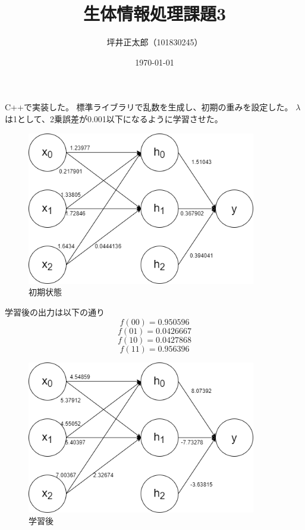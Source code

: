 \documentclass[a4paper,10pt]{jsarticle}
\begin{document}
\title{生体情報処理課題3}
\author{坪井正太郎（101830245）}
\date{\today}
\maketitle
\section{}
C++で実装した。
標準ライブラリで乱数を生成し、初期の重みを設定した。
$\lambda$は1として、2乗誤差が0.001以下になるように学習させた。

\begin{figure}[H]
  \centering
  \includegraphics[width=10cm]{01.png}
  \caption{初期状態}
\end{figure}

学習後の出力は以下の通り
\[f(00)=0.950596\]
\[f(01)=0.0426667\]
\[f(10)=0.0427868\]
\[f(11)=0.956396\]

\begin{figure}[H]
  \centering
  \includegraphics[width=10cm]{02.png}
  \caption{学習後}
\end{figure}
\end{document}
